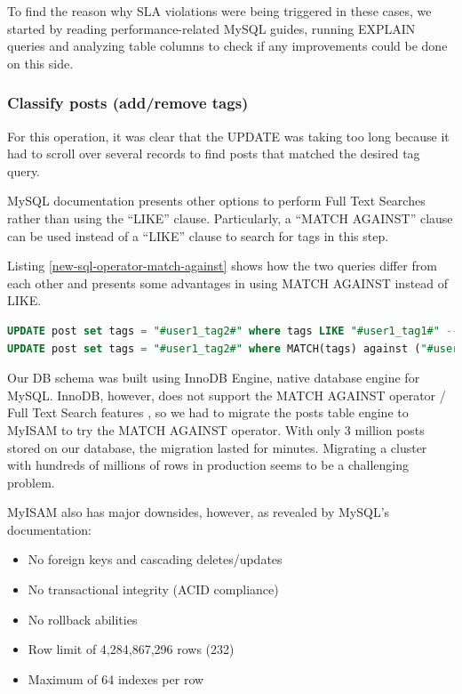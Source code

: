 To find the reason why SLA violations were being triggered in these cases, we started by reading performance-related MySQL guides, running EXPLAIN queries and analyzing table columns to check if any improvements could be done on this side.

\subsubsection{Classify posts (add/remove tags)}

For this operation, it was clear that the UPDATE was taking too long because it had to scroll over several records to find posts that matched the desired tag query.

MySQL documentation presents other options to perform Full Text Searches rather than using the ``LIKE'' clause. Particularly, a ``MATCH AGAINST'' clause can be used instead of a ``LIKE'' clause to search for tags in this step. 

Listing \ref{new-sql-operator-match-against} shows how the two queries differ from each other and \cite{stackoverflowmatch} presents some advantages in using MATCH AGAINST instead of LIKE.

\begin{lstlisting}[language=SQL,firstnumber=1, caption=A new operator - MATCH AGAINST, label=new-sql-operator-match-against]
UPDATE post set tags = "#user1_tag2#" where tags LIKE "#user1_tag1#" -- old sentence
UPDATE post set tags = "#user1_tag2#" where MATCH(tags) against ("#user1_tag1#" IN BOOLEAN MODE) -- new sentence
\end{lstlisting} 

Our DB schema was built using InnoDB Engine, native database engine for MySQL. InnoDB, however, does not support the MATCH AGAINST operator / Full Text Search features \cite{ftsmysql}, so we had to migrate the posts table engine to MyISAM to try the MATCH AGAINST operator. With only 3 million posts stored on our database, the migration lasted for minutes. Migrating a cluster with hundreds of millions of rows in production seems to be a challenging problem. 

MyISAM also has major downsides, however, as revealed by MySQL's documentation: 
\begin{itemize}
\item{No foreign keys and cascading deletes/updates}
\item{No transactional integrity (ACID compliance)}
\item{No rollback abilities}
\item{Row limit of 4,284,867,296 rows (232)}
\item{Maximum of 64 indexes per row}
\end{itemize}
	

